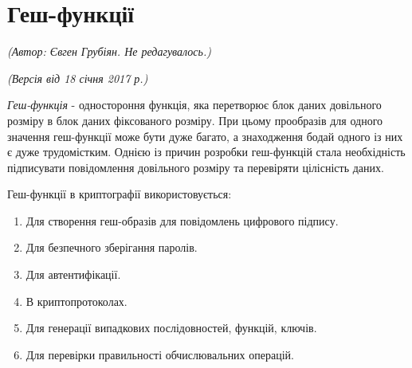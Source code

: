 \section{Геш-функції}
\begin{flushright}
\emph{(Автор: Євген Грубіян. Не редагувалось.)}
\par \emph{(Версія від 18 січня 2017 р.)}
\end{flushright}

\textit{Геш-функція} - одностороння функція, яка перетворює блок даних довільного розміру в блок даних фіксованого розміру. При цьому прообразів для одного значення геш-функції може бути дуже багато, а знаходження бодай одного із них є дуже трудомістким. Однією із причин розробки геш-функцій стала необхідність підписувати повідомлення довільного розміру та перевіряти цілісність даних.

Геш-функції в криптографії використовується:
\begin{enumerate}
\item Для створення геш-образів для повідомлень цифрового підпису.
\item Для безпечного зберігання паролів.
\item Для автентифікації.
\item В криптопротоколах.
\item Для генерації випадкових послідовностей, функцій, ключів.
\item Для перевірки правильності обчислювальних операцій.
\end{enumerate}

